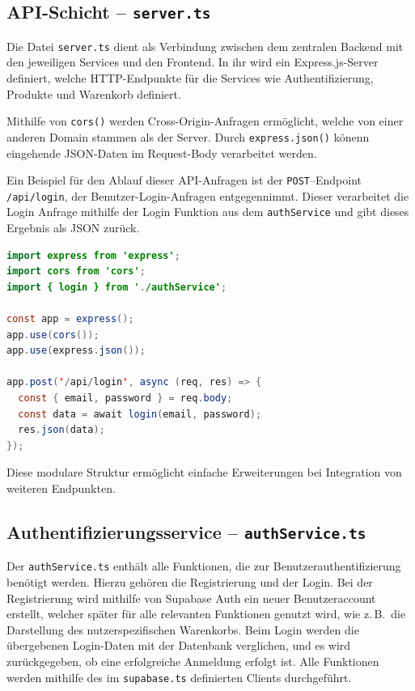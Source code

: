\documentclass[oneside]{ausarbeitung}
\begin{document}
\subsection{API-Schicht – \texttt{server.ts}}

Die Datei \texttt{server.ts} dient als Verbindung zwischen dem zentralen Backend mit den jeweiligen Services und den Frontend. In ihr wird ein Express.js-Server definiert, welche HTTP-Endpunkte für die Services wie Authentifizierung, Produkte und Warenkorb definiert.

Mithilfe von \texttt{cors()} werden Cross-Origin-Anfragen ermöglicht, welche von einer anderen Domain stammen als der Server. Durch \texttt{express.json()} könenn eingehende JSON-Daten im Request-Body verarbeitet werden. 

Ein Beispiel für den Ablauf dieser API-Anfragen ist der \texttt{POST}–Endpoint \texttt{/api/login}, der Benutzer-Login-Anfragen entgegennimmt. Dieser verarbeitet die Login Anfrage mithilfe der Login Funktion aus dem \texttt{authService} und gibt dieses Ergebnis als JSON zurück. 


\begin{lstlisting}[language=Java, caption={Auszug aus \texttt{server.ts}}]
import express from 'express';
import cors from 'cors';
import { login } from './authService';

const app = express();
app.use(cors());
app.use(express.json());

app.post('/api/login', async (req, res) => {
  const { email, password } = req.body;
  const data = await login(email, password);
  res.json(data);
});
\end{lstlisting}

Diese modulare Struktur ermöglicht einfache Erweiterungen bei Integration von weiteren Endpunkten. 

\subsection{Authentifizierungsservice – \texttt{authService.ts}}

Der \texttt{authService.ts} enthält alle Funktionen, die zur Benutzerauthentifizierung benötigt werden. Hierzu gehören die Registrierung und der Login. Bei der Registrierung wird mithilfe von Supabase Auth ein neuer Benutzeraccount erstellt, welcher später für alle relevanten Funktionen genutzt wird, wie z.\,B.\ die Darstellung des nutzerspezifischen Warenkorbs. Beim Login werden die übergebenen Login-Daten mit der Datenbank verglichen, und es wird zurückgegeben, ob eine erfolgreiche Anmeldung erfolgt ist.
Alle Funktionen werden mithilfe des im \texttt{supabase.ts} definierten Clients durchgeführt.
\end{document}

